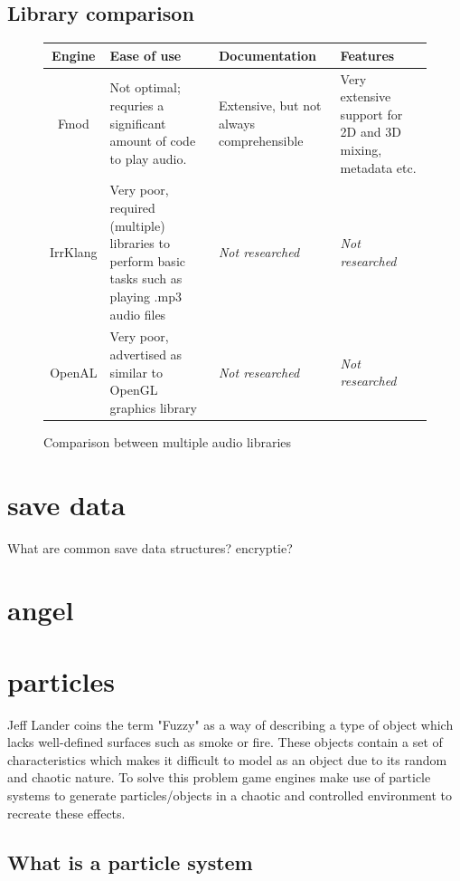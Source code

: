 \documentclass{article} %
\begin{document}
\subsection{Library comparison}
\begin{figure}[h!]
	\centering
    \begin{tabularx}{\textwidth}{|c|X|X|X|} \hline
        \textbf{Engine} & \textbf{Ease of use} & \textbf{Documentation} & \textbf{Features} \\ \hline
        Fmod & Not optimal; requries a significant amount of code to play audio. & Extensive, but not always comprehensible & Very extensive support for 2D and 3D mixing, metadata etc. \\ \hline
        IrrKlang & Very poor, required (multiple) libraries to perform basic tasks such as playing .mp3 audio files & \textit{Not researched} & \textit{Not researched} \\ \hline
		OpenAL & Very poor, advertised as similar to OpenGL graphics library & \textit{Not researched} & \textit{Not researched} \\ \hline
    \end{tabularx}
    \caption{Comparison between multiple audio libraries}
	\label{fig:audioLibComparison}
\end{figure}

\section{save data}
What are common save data structures?
encryptie?
\newpage

\section{angel}
\section{particles}

Jeff Lander coins the term "Fuzzy" as a way of describing a type of object which lacks well-defined surfaces such as smoke or fire. \cite{Lander_1998} These objects contain a set of characteristics which makes it difficult to model as an object due to its random and chaotic nature. To solve this problem game engines make use of particle systems to generate particles/objects in a chaotic and controlled environment to recreate these effects.

\subsection{What is a particle system}
\end{document}
